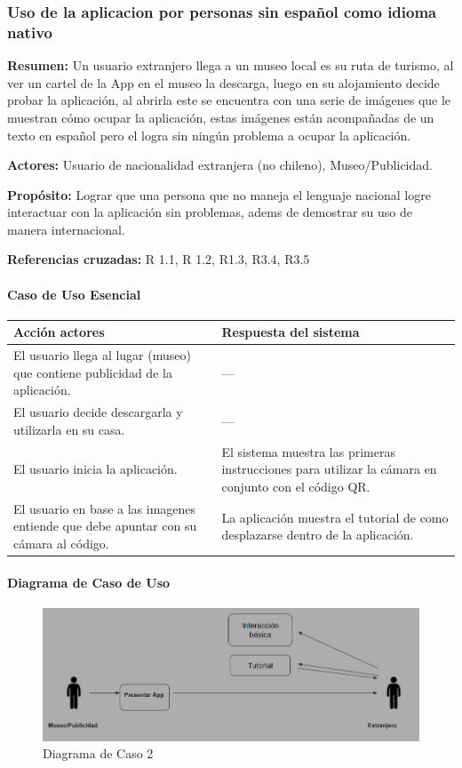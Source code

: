 \subsubsection{Uso de la aplicacion por personas sin español como idioma nativo}

{\textbf {Resumen:}}
Un usuario extranjero llega a un museo local es su ruta de turismo, al ver un cartel de la App en el museo la descarga, luego en su alojamiento decide probar la aplicación, al abrirla este se encuentra con una serie de imágenes que le muestran cómo ocupar la aplicación, estas imágenes están acompañadas de un texto en español pero el logra sin ningún problema a ocupar la aplicación.

{\textbf {Actores:}}
Usuario de nacionalidad extranjera (no chileno), Museo/Publicidad.

{\textbf {Propósito:}}
Lograr que una persona que no maneja el lenguaje nacional logre interactuar con la aplicación sin problemas, adems de demostrar su uso de manera internacional.

{\textbf {Referencias cruzadas:}}
R 1.1, R 1.2, R1.3, R3.4, R3.5

\paragraph{Caso de Uso Esencial}

\begin{longtable}{|p{5cm}|p{8cm}|}
\hline 
Acción actores & Respuesta del sistema \\ 
\hline 
El usuario llega al lugar (museo) que contiene publicidad de la aplicación. & --- \\ 
\hline 
El usuario decide descargarla y utilizarla en su casa. & --- \\ 
\hline 
El usuario inicia la aplicación. & El sistema muestra las primeras instrucciones para utilizar la cámara en conjunto con el código QR.
 \\ 
\hline 
El usuario en base a las imagenes entiende que debe apuntar con su cámara al código. & La aplicación muestra el tutorial de como desplazarse dentro de la aplicación. \\ 
\hline 
\end{longtable}

\paragraph{Diagrama de Caso de Uso}

\begin{figure}[H]
\centerline{\includegraphics[width=15cm]{imgs/CasoUso_2.PNG}}
\caption{Diagrama de Caso 2}
\label{fig_2_1}
\end{figure}

